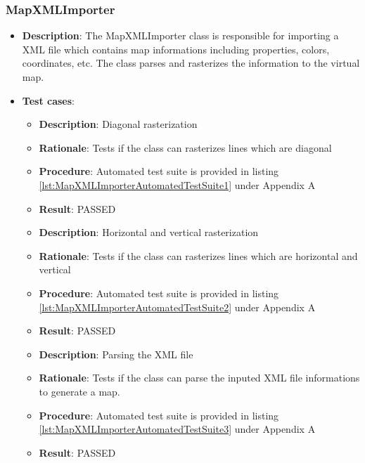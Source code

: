 \documentclass[12pt,a4paper]{article}
\begin{document}
    \subsubsection{MapXMLImporter}
	\begin{itemize}
	\item \textbf{Description}: The MapXMLImporter class is responsible for importing a XML file which contains map informations including properties, colors, coordinates, etc.  The class parses and rasterizes the information to the virtual map.
	\item \textbf{Test cases}:
	\begin{itemize}
		\item \textbf{Description}:	Diagonal rasterization
		\item \textbf{Rationale}: Tests if the class can rasterizes lines which are diagonal
		\item \textbf{Procedure}: Automated test suite is provided in listing \ref{lst:MapXMLImporterAutomatedTestSuite1} under Appendix A
		\item \textbf{Result}: PASSED
	\end{itemize}
    \begin{itemize}
		\item \textbf{Description}:	Horizontal and vertical rasterization
		\item \textbf{Rationale}: Tests if the class can rasterizes lines which are horizontal and vertical
		\item \textbf{Procedure}: Automated test suite is provided in listing \ref{lst:MapXMLImporterAutomatedTestSuite2} under Appendix A
		\item \textbf{Result}: PASSED
	\end{itemize}
    \begin{itemize}
		\item \textbf{Description}:	Parsing the XML file
		\item \textbf{Rationale}: Tests if the class can parse the inputed XML file informations to generate a map.
		\item \textbf{Procedure}: Automated test suite is provided in listing \ref{lst:MapXMLImporterAutomatedTestSuite3} under Appendix A
		\item \textbf{Result}: PASSED
	\end{itemize}
	\end{itemize}
    
\end{document}
